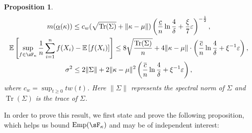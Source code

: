 \documentclass{article}
\theoremstyle{plain}
\newtheorem{proposition}[theorem]{Proposition}
\theoremstyle{definition}
\DeclareMathOperator{\tr}{Tr}
\DeclareMathOperator{\Emp}{Emp}
\begin{document}
\begin{appendix}
\begin{proposition}
\begin{gather*}
		m(\underline{\alpha}(\kappa))\leq c_w (\sqrt{ \tr(\Sigma)}+\lVert \kappa-\mu\rVert)\left(\frac{\underline{c} }{n}\ln\frac{4}{\delta } + \frac{\xi}{7 }\varepsilon \right)^{-\frac{1}{2}},\\
    \mathbb{E}\left[\sup_{f \in \sF_\kappa } \frac{1}{n}\sum_{i=1}^n f(X_i)-\mathbb{E}\left[f(X_i)\right]\right] \le 8\sqrt{ \frac{ \tr(\Sigma)}{n}}+4\lVert \kappa -\mu \rVert \cdot \left(\frac{\overline{c}}{n} \ln \frac{4}{\delta } + \xi^{-1}\varepsilon \right), \\
    \sigma^2 \le 2\lVert \Sigma \rVert + 2\lVert \kappa -\mu \rVert^2 \left(\frac{\overline{c}}{n} \ln \frac{4}{\delta } + \xi^{-1}\varepsilon \right),
	\end{gather*}
  where \( c_w=\sup_{t \ge 0} tw(t) \). Here \( \lVert \Sigma\rVert \) represents the spectral norm of \( \Sigma  \) and \( \tr(\Sigma) \) is the trace of \( \Sigma \). 
\end{proposition}
In order to prove this result, we first state and prove the following proposition, which helps us bound \( \Emp(\sF_\kappa ) \) and may be of independent interest: 


\end{appendix}
\end{document}
